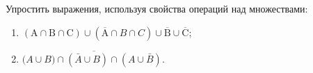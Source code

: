\question
Упростить выражения, используя свойства операций над множествами:

\begin{enumerate}
	\renewcommand{\labelenumi}{\alph{enumi})}
	\item $(\mathrm{A} \cap \mathrm{B} \cap \mathrm{C}) \cup(\overline{\mathrm{A}} \cap B \cap C) \cup \overline{\mathrm{B}} \cup \overline{\mathrm{C}}$;
	\item $(\overline{A \cup B) \cap(\bar{A} \cup B) \cap(A \cup \bar{B})}$.
\end{enumerate}
